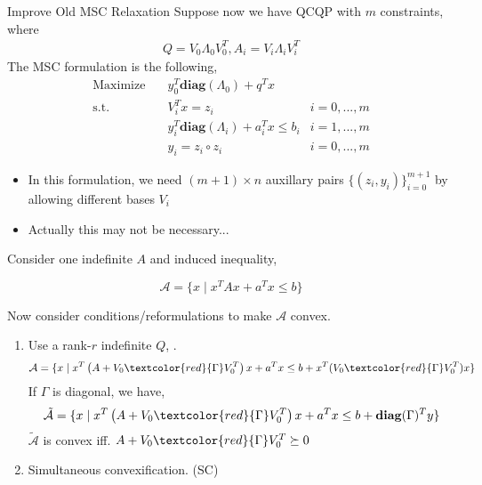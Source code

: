 \documentclass[aspectratio=1610, 9pt]{beamer}
\newcommand{\diag}{\mathbf{diag}}
\newcommand{\red}[1]{\textcolor{red}{#1}}
\begin{document}
\begin{frame}[allowframebreaks]{Improve Old MSC Relaxation}
  Suppose now we have QCQP with \(m\) constraints, where
  \begin{align*}
    Q = V_0\Lambda_0V_0^T, A_i = V_i\Lambda_iV_i^T
  \end{align*}
  The MSC formulation is the following,
  \begin{align}
    \nonumber \mathrm{Maximize}\quad & y_0 ^T\diag(\Lambda_0) + q^Tx                         \\
    \mathrm{s.t.} \quad              & V_i^T x = z_i                             & i=0,...,m \\
                                     & y_i ^T\diag(\Lambda_i)  + a_i^Tx  \le b_i & i=1,...,m \\
    \label{quad}                     & y_i = z_i \circ z_i                       & i=0,...,m
  \end{align}
  \begin{itemize}
    \item In this formulation, we need \((m + 1) \times n\) auxillary pairs \(\{(z_i, y_i)\}_{i=0}^{m+1}\) by allowing different bases \(V_i\)
    \item Actually this may not be necessary...
  \end{itemize}

  \framebreak
  Consider one indefinite \(A\) and induced inequality,

  \[\mathcal A =  \{x \mid x^TAx +a^Tx \le b\}\]

  Now consider conditions/reformulations to make \(\mathcal A\) convex.

  \begin{enumerate}
    \item Use a rank-\(r\) indefinite \(Q\), \label{cond.1.A.convexify}.
          \[\mathcal A =  \{x \mid x^T\left(A + V_0\red{\Gamma}V^T_0\right )x +a^Tx \le b + x^T(V_0\red{\Gamma}V^T_0)x\}\]
          If \(\Gamma\) is diagonal, we have,
          \[\tilde {\mathcal  A} =  \{x \mid x^T\left(A + V_0\red{\Gamma}V^T_0\right )x + a^Tx \le b +\diag(\Gamma)^T y\}\]
          \(\tilde {\mathcal  A}\) is convex iff. \(A + V_0\red{\Gamma}V^T_0 \succeq 0\)

    \item Simultaneous convexification. (SC)
  \end{enumerate}

\end{frame}
\end{document}
